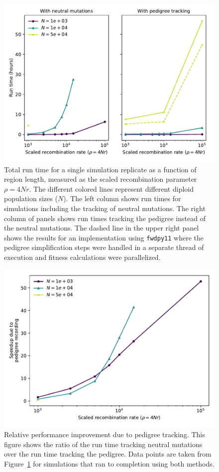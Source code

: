 \documentclass{article}
\newcommand{\fwdpy}{\texttt{fwdpy11}}
\begin{document}
\begin{figure}
    \includegraphics[]{sims/rawspeed}
    \caption{\label{fig:runtimes_selection}Total run time for a single simulation replicate as a function of region
        length, measured as the scaled recombination parameter $\rho = 4Nr$. The different colored lines represent
        different diploid population sizes ($N$). The left column shows run times for
        simulations including the tracking of neutral mutations. The right column of
panels shows run times tracking the pedigree instead of the neutral mutations. The dashed line in the upper right panel shows
the results for an implementation using \fwdpy{} where the pedigree simplification steps were handled in a separate thread of
execution and fitness calculations were parallelized.}
\end{figure}


\begin{figure}
    \includegraphics[]{sims/speedup}
    \caption{\label{fig:relative_speedup_selection}Relative performance improvement due to pedigree tracking. This figure
    shows the ratio of the run time tracking neutral mutations over the run time tracking the pedigree. Data points are taken
from Figure~\ref{fig:runtimes_selection} for simulations that ran to completion using both methods.}
\end{figure}
\end{document}

